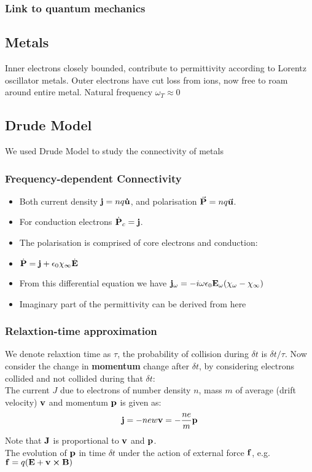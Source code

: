 \documentclass[12pt,a4paper]{article}
\begin{document}
    \subsubsection{Link to quantum mechanics
    }
        

\subsection{Metals}
    Inner electrons closely bounded, contribute to permittivity according to Lorentz oscillator metals.
    Outer electrons have cut loss from ions, now free to roam around entire metal.
    Natural frequency $\omega_T \approx 0$
\subsection{Drude Model}
    We used Drude Model to study the connectivity of metals
    \subsubsection{Frequency-dependent Connectivity}
        \begin{itemize}
            \item Both current density $\vb{j}= nq\vb{\dot{u}}$, and polarisation $\va{P}=nq\va{u}$.
            \item For conduction electrons $\dot{\vb{P}}_c = \vb{j}$.
            \item The polarisation is comprised of core electrons and conduction:
            \item $\dot{\vb{P}} = \vb{j} + \epsilon_0 \chi_\infty \dot{\vb{E}}$
            \item From this differential equation we have $\vb{j}_\omega = -i\omega \epsilon_0 \vb{E}_\omega (\chi_\omega-\chi_\infty)$
            \item Imaginary part of the permittivity can be derived from here 
        \end{itemize}
    \subsubsection{Relaxtion-time approximation}
        We denote relaxtion time as $\tau$, the probability of collision during $\delta t$ is $\delta t/\tau$.
        Now consider the change in \textbf{momentum} change after $\delta t$, by considering electrons collided and not collided during that $\delta t$:\\
        The current $J$ due to electrons of number density $n$, mass $m$ of average (drift velocity) $\vb{v}$ and momentum $\vb{p}$ is given as:
        \begin{equation}
            \vb{j}=-new\vb{v}=-\frac{ne}{m}\vb{p}
        \end{equation}
        Note that $\vb{J}$ is proportional to $\vb{v}$ and $\vb{p}$.\\
        The evolution of $\vb{p}$ in time $\delta t$ under the action of external force $\vb{f}$, e.g. $\vb{f}=q(\vb{E}+\vb{v}\crossproduct\vb{B})$
\end{document}
